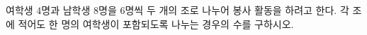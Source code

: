 \hspace*{2mm}\begin{minipage}[t]{\dimexpr\linewidth-2mm\relax}\vspace{0pt}
여학생 $4$명과 남학생 $8$명을 $6$명씩 두 개의 조로 나누어 봉사 활동을 하려고 한다. 각 조에 적어도 한 명의 여학생이 포함되도록 나누는 경우의 수를 구하시오.\end{minipage}
